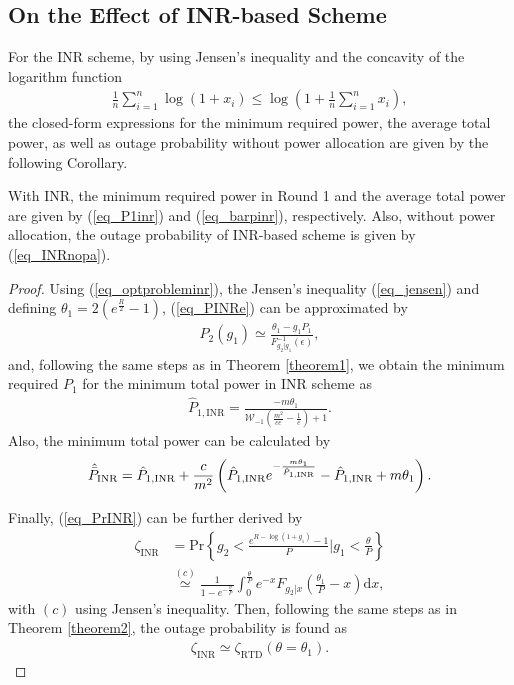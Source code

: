 \subsection{On the Effect of INR-based Scheme}
For the INR scheme, by using Jensen's inequality and the concavity of the logarithm function \cite[Eq. 30]{makki2016TWCRFFSO}
\begin{align}\label{eq_jensen}
   \frac{1}{n}\sum_{i=1}^{n} \log (1+x_i)\leq\log\left(1+\frac{1}{n}\sum_{i=1}^{n}x_i\right),
\end{align}
the closed-form expressions for the minimum required power, the average total power, as well as outage probability without power allocation are given by the following Corollary.
\begin{corollary}
With INR, the minimum required power in Round 1 and the average total power are given by (\ref{eq_P1inr}) and (\ref{eq_barpinr}), respectively.  Also, without power allocation, the outage probability of INR-based scheme is given by (\ref{eq_INRnopa}).
\end{corollary}
\begin{proof}
Using (\ref{eq_optprobleminr}), the Jensen's inequality (\ref{eq_jensen}) and defining $\theta_1 =2\left(e^{\frac{R}{2}}-1\right)$, (\ref{eq_PINRe}) can be approximated by
\begin{align}
     P_2(g_1) \simeq \frac{\theta_1 - g_1P_1}{F_{g_2|g_1}^{-1}(\epsilon)},
\end{align}
and, following the same steps as in Theorem \ref{theorem1}, we obtain the minimum required $P_1$ for the minimum total power in INR scheme as
\begin{align}
  \label{eq_P1inr}
    \hat{P}_{1,\text{INR}}= \frac{-m\theta_1}{\mathcal{W}_{-1}\left(\frac{m^2}{ce}-\frac{1}{e}\right)+1}.
\end{align}
Also, the  minimum total  power can be calculated by
\begin{align}\label{eq_barpinr}
    \hat{\Bar{P}}_{\text{INR}} =\hat{P}_{1,\text{INR}} + \frac{c}{m^2}\left(\hat{P}_{1,\text{INR}} e^{-\frac{m\theta_1}{\hat{P}_{1,\text{INR}}}}-\hat{P}_{1,\text{INR}} + m\theta_1\right).
\end{align}

Finally, (\ref{eq_PrINR}) can be further derived by
\begin{align}
    \zeta_{\text{INR}} &= \text{Pr}\left\{  g_2< \frac{e^{R-\log(1+g_1)}-1}{P}\Big|g_1 < \frac{\theta}{P} \right\}\nonumber\\
    &\overset{(c)}{\simeq}\frac{1}{1-e^{-\frac{\theta}{P}}}\int_{0}^{\frac{\theta}{P}} e^{- x} F_{g_2|x}\left(\frac{\theta_1}{P}-x\right) \text{d}x,
\end{align}
with $(c)$ using Jensen's inequality. Then, following the same steps as in Theorem \ref{theorem2}, the outage probability is found as 
\begin{align}\label{eq_INRnopa}
    \zeta_{\text{INR}} \simeq \zeta_{\text{RTD}}(\theta = \theta_1).
\end{align}
\end{proof}


